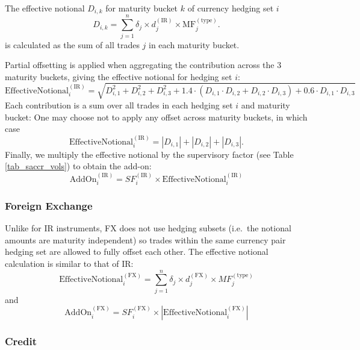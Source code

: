 The effective notional $D_{i, k}$ for maturity bucket $k$ of currency hedging set $i$
\begin{equation*}
  D_{i, k} = \sum_{j=1}^n \delta_j \times d_j^{(\text{IR})} \times \text{MF}_j^{(\text{type})}.
\end{equation*}
is calculated as the sum of all trades $j$ in each maturity bucket.

Partial offsetting is applied when aggregating the contribution across the 3 maturity buckets,
giving the effective notional for hedging set $i$:
\begin{equation*}
  \text{EffectiveNotional}_i^{(\text{IR})} = \sqrt{D_{i,1}^2 + D_{i,2}^2 + D_{i,3}^2 + 1.4 \cdot (D_{i,1}\cdot D_{i,2} + D_{i,2}\cdot D_{i,3}) 
+ 0.6 \cdot D_{i,1} \cdot D_{i,3}}
\end{equation*}
Each contribution is a sum over all trades in each hedging set $i$ and maturity bucket: 
One may choose not to apply any offset across maturity buckets, in which case
\begin{equation*}
  \text{EffectiveNotional}_i^{(\text{IR})} = |D_{i,1}| + |D_{i,2}| + |D_{i,3}|.
\end{equation*}
Finally, we multiply the effective notional by the supervisory factor (see Table \ref{tab_saccr_vols}) to
obtain the add-on:
\begin{equation*}
  \text{AddOn}_i^{(\text{IR})} = SF_i^{(\text{IR})} \times \text{EffectiveNotional}_i^{(\text{IR})}
\end{equation*}

\subsubsection*{Foreign Exchange}

Unlike for IR instruments, FX does not use hedging subsets (i.e.\ the notional amounts are maturity independent)
so trades within the same currency pair hedging set are allowed to fully offset each other. The effective notional
calculation is similar to that of IR:
\begin{equation*}
  \text{EffectiveNotional}_i^{(\text{FX})} = \sum_{j=1}^n \delta_j \times d^{(\text{FX})}_j \times MF_j^{(\text{type})}
\end{equation*}
and
\begin{equation*}
  \text{AddOn}_i^{(\text{FX})} = SF_i^{(\text{FX})} \times \left|\text{EffectiveNotional}_i^{(\text{FX})}\right|
\end{equation*}

\subsubsection*{Credit}

